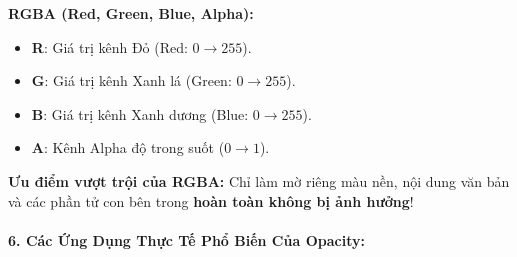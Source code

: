\documentclass[11pt,oneside]{book}
\begin{document}
\begin{conceptBox}
\textbf{RGBA (Red, Green, Blue, Alpha):}
\begin{itemize}[leftmargin=1.5em, itemsep=2pt, parsep=0pt]
    \item \textbf{R}: Giá trị kênh Đỏ (Red: $0 \rightarrow 255$).
    \item \textbf{G}: Giá trị kênh Xanh lá (Green: $0 \rightarrow 255$).
    \item \textbf{B}: Giá trị kênh Xanh dương (Blue: $0 \rightarrow 255$).
    \item \textbf{A}: Kênh Alpha độ trong suốt ($0 \rightarrow 1$).
\end{itemize}
\par\vspace{4pt}
\textbf{Ưu điểm vượt trội của RGBA:} Chỉ làm mờ riêng màu nền, nội dung văn bản và các phần tử con bên trong \textbf{hoàn toàn không bị ảnh hưởng}!
\end{conceptBox}

\paragraph{6. Các Ứng Dụng Thực Tế Phổ Biến Của Opacity:}
\end{document}
